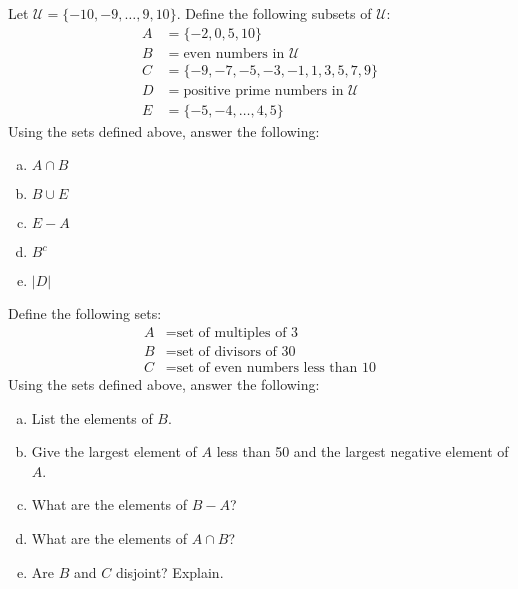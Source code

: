 \documentclass[11pt,letterpaper]{article}
\begin{document}

 Let $\mathcal{U}= \{ -10, -9, \ldots, 9, 10 \}$. Define the following subsets of $\mathcal{U}$:
	\[
	\begin{aligned}
	A&= \{ -2, 0, 5, 10 \} \\
	B&= \text{even numbers in } \mathcal{U} \\
	C&= \{ -9, -7, -5, -3, -1, 1, 3, 5, 7, 9 \} \\
	D&= \text{positive prime numbers in } \mathcal{U} \\
	E&= \{ -5, -4, \ldots, 4, 5 \} 
	\end{aligned}
	\]
Using the sets defined above, answer the following: 
        \begin{enumerate}[(a)]
        \item $A \cap B$
        \item $B \cup E$
        \item $E - A$
        \item $B^c$
        \item $|D|$
        \end{enumerate}



\newpage



 Define the following sets:
	\[
	\begin{aligned}
	A&= \text{set of multiples of 3} \\
	B&= \text{set of divisors of 30} \\
	C&= \text{set of even numbers less than 10} 
	\end{aligned}
	\]
Using the sets defined above, answer the following:
        \begin{enumerate}[(a)]
        \item List the elements of $B$.
        \item Give the largest element of $A$ less than 50 and the largest negative element of $A$.
        \item What are the elements of $B - A$?
        \item What are the elements of $A \cap B$?
        \item Are $B$ and $C$ disjoint? Explain. 
        \end{enumerate}



\newpage
\end{document}
